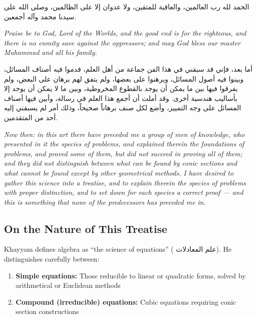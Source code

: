 \begin{propositionbox}

\begin{Arabic}
الحمد لله رب العالمين، والعاقبة للمتقين، ولا عدوان إلا على الظالمين، وصلى الله على سيدنا محمد وآله أجمعين.

\end{Arabic}

\textit{Praise be to God, Lord of the Worlds, and the good end is for the righteous, and there is no enmity save against the oppressors;
 and may God bless our master Muhammad and all his family.}

\begin{Arabic}
أما بعد، فإني قد سبقني في هذا الفن جماعة من أهل العلم، قدموا فيه أصناف المسائل، وبينوا فيه أصول المسائل، وبرهنوا على بعضها، ولم يتفق لهم برهان على البعض، ولم يفرقوا فيها بين ما يمكن أن يوجد بالقطوع المخروطية، وبين ما لا يمكن أن يوجد إلا بأساليب هندسية أخرى. وقد أملت أن أجمع هذا العلم في رسالة، وأبين فيها أصناف المسائل على وجه التمييز، وأضع لكل صنف برهاناً صحيحاً، وذلك أمر لم يسبقني إليه أحد من المتقدمين.

\end{Arabic}

\textit{Now then: in this art there have preceded me a group of men of knowledge, who presented in it the species of problems, and explained therein the foundations of problems, and proved some of them, but did not succeed in proving all of them;
 and they did not distinguish between what can be found by conic sections and what cannot be found except by other geometrical methods. I have desired to gather this science into a treatise, and to explain therein the species of problems with proper distinction, and to set down for each species a correct proof --- and this is something that none of the predecessors has preceded me in.}

\end{propositionbox}

\subsection{On the Nature of This Treatise}

\label{subsec:nature}
Khayyam defines algebra as ``the science of equations'' (
\textarabic{علم المعادلات}). He distinguishes carefully between:

\begin{enumerate}
[noitemsep]
\item 
\textbf{Simple equations:} Those reducible to linear or quadratic forms, solved by arithmetical or Euclidean methods
\item 
\textbf{Compound (irreducible) equations:} Cubic equations requiring conic section constructions

\end{enumerate}

